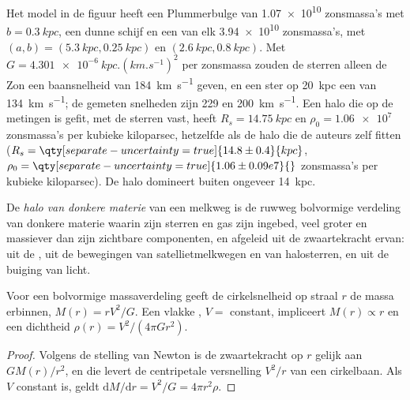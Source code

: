 Het model in de figuur heeft een Plummerbulge van
\num{1.07e10} zonsmassa's met $b = \qty{0.3}{kpc}$, een dunne schijf en een
 van elk \num{3.94e10} zonsmassa's, met $(a, b) =
(\qty{5.3}{kpc}, \qty{0.25}{kpc})$ en $(\qty{2.6}{kpc}, \qty{0.8}{kpc})$.
Met $G = \qty{4.301e-6}{kpc.(km.s^{-1})^2}$ per zonsmassa zouden de sterren
alleen de Zon een baansnelheid van \qty{184}{km.s^{-1}} geven, en een
ster op \qty{20}{kpc} een van \qty{134}{km.s^{-1}}; de gemeten snelheden zijn
229 en \qty{200}{km.s^{-1}}. Een halo die op de metingen is gefit, met de
sterren vast, heeft $R_s = \qty{14.75}{kpc}$ en
$\rho_0 = \num{1.06e7}$ zonsmassa's per kubieke kiloparsec, hetzelfde als
de halo die de auteurs zelf fitten ($R_s = \qty[separate-uncertainty=true]{14.8 \pm 0.4}{kpc}$,
$\rho_0 = \qty[separate-uncertainty=true]{1.06 \pm 0.09 e7}{}$ zonsmassa's
per kubieke kiloparsec). De halo domineert buiten ongeveer \qty{14}{kpc}.

\begin{definition}\label{def:b3:milky-way-galaxies:halo}
De \emph{halo van donkere materie} van een melkweg is de
ruwweg bolvormige verdeling van donkere materie waarin zijn sterren en gas
zijn ingebed, veel groter en massiever dan zijn zichtbare componenten,
en afgeleid uit de zwaartekracht ervan: uit de , uit de bewegingen
van satellietmelkwegen en van halosterren, en uit de buiging van licht.
\end{definition}

\begin{theorem}\label{thm:b3:milky-way-galaxies:enclosed}
Voor een bolvormige massaverdeling geeft de cirkelsnelheid op straal $r$
de massa erbinnen, $M(r) = rV^2/G$. Een vlakke ,
$V = $ constant, impliceert $M(r) \propto r$ en een dichtheid
$\rho(r) = V^2/(4\pi G r^2)$.
\end{theorem}

\begin{proof}
Volgens de stelling van Newton is de zwaartekracht op $r$ gelijk aan $GM(r)/r^2$, en die levert
de centripetale versnelling $V^2/r$ van een cirkelbaan. Als $V$ constant is,
geldt $\mathrm{d}M/\mathrm{d}r = V^2/G = 4\pi r^2\rho$.
\end{proof}

